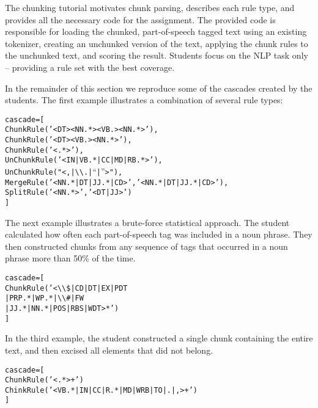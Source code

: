 \documentclass[11pt]{article}
\newenvironment{sv}{\scriptsize\begin{alltt}}{\end{alltt}\normalsize}
\begin{document}
The chunking tutorial motivates chunk parsing, describes each rule
type, and provides all the necessary code for the assignment.  The
provided code is responsible for loading the chunked, part-of-speech
tagged text using an existing tokenizer, creating an unchunked version
of the text, applying the chunk rules to the unchunked text, and
scoring the result.  Students focus on the NLP task only -- providing
a rule set with the best coverage.

In the remainder of this section we reproduce some of the cascades
created by the students.  The first example illustrates a combination
of several rule types:

\begin{sv}
cascade = [
  ChunkRule('<DT><NN.*><VB.><NN.*>'),
  ChunkRule('<DT><VB.><NN.*>'),
  ChunkRule('<.*>'),
  UnChunkRule('<IN|VB.*|CC|MD|RB.*>'),
  UnChunkRule("<,|{\textbackslash}{\textbackslash}.|``|''>"),
  MergeRule('<NN.*|DT|JJ.*|CD>', '<NN.*|DT|JJ.*|CD>'),
  SplitRule('<NN.*>', '<DT|JJ>')
]
\end{sv}

The next example illustrates a brute-force statistical approach.  The
student calculated how often each part-of-speech tag was included in a
noun phrase.  They then constructed chunks from any sequence of tags
that occurred in a noun phrase more than 50\% of the time.

\begin{sv}
cascade = [
  ChunkRule('<{\textbackslash}{\textbackslash}\$|CD|DT|EX|PDT
             |PRP.*|WP.*|{\textbackslash}{\textbackslash}\#|FW
             |JJ.*|NN.*|POS|RBS|WDT>*')
]
\end{sv}

In the third example, the student constructed a single chunk
containing the entire text, and then excised all elements that did not
belong.

\begin{sv}
cascade = [
  ChunkRule('<.*>+')
  ChinkRule('<VB.*|IN|CC|R.*|MD|WRB|TO|.|,>+')
]
\end{sv}


%
\end{document}
